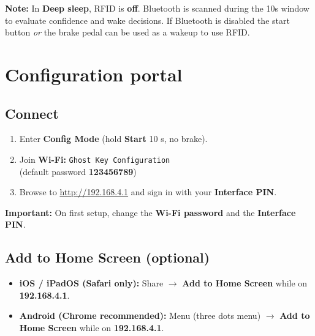 \documentclass[11pt]{article}
\newcommand{\gkto}{\texorpdfstring{$\rightarrow$}{->}}
\newcommand{\gkmenu}{(three dots menu)}
\begin{document}
\begin{gknote}
\textbf{Note:} In \textbf{Deep sleep}, RFID is \textbf{off}. Bluetooth is scanned during the 10s window to evaluate confidence and wake decisions. If Bluetooth is disabled the start button \emph{or} the brake pedal can be used as a wakeup to use RFID.
\end{gknote}

\section{Configuration portal}
\subsection{Connect}
\begin{enumerate}
  \item Enter \textbf{Config Mode} (hold \textbf{Start} 10 s, no brake).
  \item Join \textbf{Wi-Fi:} \texttt{Ghost Key Configuration}\\
        (default password \textbf{123456789})
  \item Browse to \url{http://192.168.4.1} and sign in with your \textbf{Interface PIN}.
\end{enumerate}

\begin{gkimportant}
\textbf{Important:} On first setup, change the \textbf{Wi-Fi password} and the \textbf{Interface PIN}.
\end{gkimportant}

\subsection{Add to Home Screen (optional)}
\begin{itemize}
  \item \textbf{iOS / iPadOS (Safari only):} Share \gkto{} \textbf{Add to Home Screen} while on \textbf{192.168.4.1}.
  \item \textbf{Android (Chrome recommended):} Menu \gkmenu{} \gkto{} \textbf{Add to Home Screen} while on \textbf{192.168.4.1}.
\end{itemize}
\end{document}

